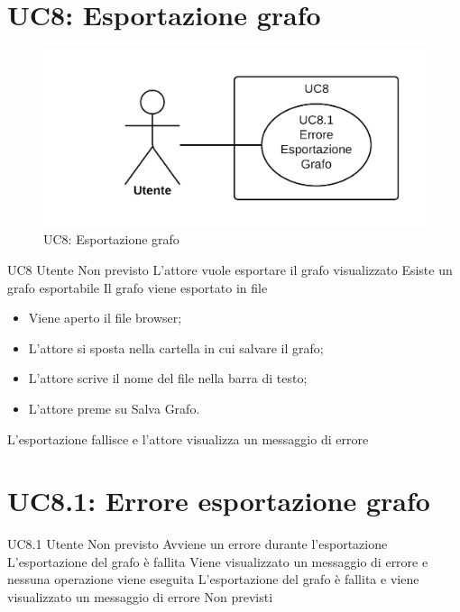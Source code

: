 \documentclass[../AnalisideiRequisiti.tex]{subfiles}
\begin{document}
\section{UC8: Esportazione grafo}
\begin{figure}[H]
	\centering
	\includegraphics[width=\textwidth]{../img/UC8.png}
	\caption{UC8: Esportazione grafo}
\end{figure}
\UserCase
{UC8}
{Utente}
{Non previsto}
{L'attore vuole esportare il grafo visualizzato}
{Esiste un grafo esportabile}
{Il grafo viene esportato in file}
{
	\begin{itemize}
			\item{} Viene aperto il file browser;
			\item{} L'attore si sposta nella cartella in cui salvare il grafo;
			\item{} L'attore scrive il nome del file nella barra di testo;
			\item{} L'attore preme su Salva Grafo.
	\end{itemize}
}
{L'esportazione fallisce e l'attore visualizza un messaggio di errore }

\section{UC8.1: Errore esportazione grafo}
\UserCase
{UC8.1}
{Utente}
{Non previsto}
{Avviene un errore durante l'esportazione}
{L'esportazione del grafo è fallita}
{Viene visualizzato un messaggio di errore e nessuna operazione viene eseguita}
{L'esportazione del grafo è fallita e viene visualizzato un messaggio di errore}
{Non previsti}
\end{document}

